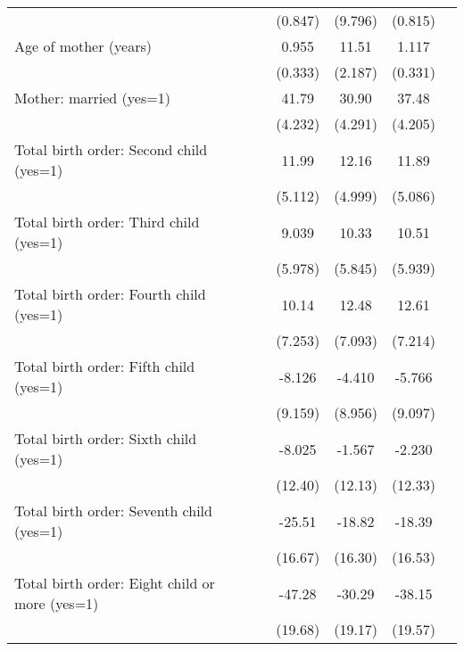 \begin{tabular}{l*{5}{c}}
                    &            &     (0.847)&     (9.796)&     (0.815)&            \\
[1em]
Age of mother (years)&            &       0.955&       11.51&       1.117&            \\
                    &            &     (0.333)&     (2.187)&     (0.331)&            \\
[1em]
Mother: married (yes=1)&            &       41.79&       30.90&       37.48&            \\
                    &            &     (4.232)&     (4.291)&     (4.205)&            \\
[1em]
Total birth order: Second child (yes=1)&            &       11.99&       12.16&       11.89&            \\
                    &            &     (5.112)&     (4.999)&     (5.086)&            \\
[1em]
Total birth order: Third child (yes=1)&            &       9.039&       10.33&       10.51&            \\
                    &            &     (5.978)&     (5.845)&     (5.939)&            \\
[1em]
Total birth order: Fourth child (yes=1)&            &       10.14&       12.48&       12.61&            \\
                    &            &     (7.253)&     (7.093)&     (7.214)&            \\
[1em]
Total birth order: Fifth child (yes=1)&            &      -8.126&      -4.410&      -5.766&            \\
                    &            &     (9.159)&     (8.956)&     (9.097)&            \\
[1em]
Total birth order: Sixth child (yes=1)&            &      -8.025&      -1.567&      -2.230&            \\
                    &            &     (12.40)&     (12.13)&     (12.33)&            \\
[1em]
Total birth order: Seventh child (yes=1)&            &      -25.51&      -18.82&      -18.39&            \\
                    &            &     (16.67)&     (16.30)&     (16.53)&            \\
[1em]
Total birth order: Eight child or more (yes=1)&            &      -47.28&      -30.29&      -38.15&            \\
                    &            &     (19.68)&     (19.17)&     (19.57)&            \\

\end{tabular}
